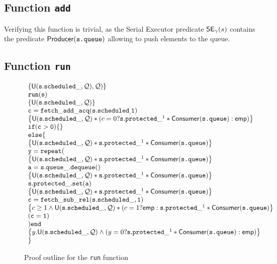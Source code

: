 \subsection{Function \texttt{add}}
Verifying this function is trivial, as the Serial Executor predicate $\mathsf{SE}_\gamma(s)$ contains the predicate $\mathsf{Producer}(\texttt{s.queue})$ allowing to push elements to the queue.

\subsection{Function \texttt{run}}

\begin{figure}
\begin{equation*}
		\begin{array}{l}
				\left\{\mathsf{U}(\mathtt{s.scheduled\_}, \mathcal{Q}), \mathcal{Q})\right\} \\
		\mathtt{run(s)} \\
		\left\{\mathsf{U}(\mathtt{s.scheduled\_}, \mathcal{Q}) \right\} \\
		\mathtt{c = fetch\_add\_acq(s.scheduled_, 1)} \\
		\left\{ \mathsf{U}(\mathtt{s.scheduled\_}, \mathcal{Q}) * (c = 0 ? \mathtt{s.protected\_}^1 * \mathsf{Consumer}(\texttt{s.queue}) : \mathsf{emp}) \right\}\\
		\mathtt{if(c > 0) \{\}}\\
				\mathtt{else \{} \\
		\left\{\mathsf{U}(\mathtt{s.scheduled\_}, \mathcal{Q}) * \mathtt{s.protected\_}^1 * \mathsf{Consumer}(\texttt{s.queue}) \right\} \\
		\mathtt{y = repeat (} \\
		\left\{\mathsf{U}(\mathtt{s.scheduled\_}, \mathcal{Q})* \mathtt{s.protected\_}^1 * \mathsf{Consumer}(\texttt{s.queue}) \right\} \\
		\mathtt{a = s.queue\_.dequeue()} \\
		\left\{\mathsf{U}(\mathtt{s.scheduled\_}, \mathcal{Q})* \mathtt{s.protected\_}^1 * \mathsf{Consumer}(\texttt{s.queue}) \right\} \\
		\mathtt{s.protected\_.set(a)} \\
		\left\{\mathsf{U}(\mathtt{s.scheduled\_}, \mathcal{Q})* \mathtt{s.protected\_}^1 * \mathsf{Consumer}(\texttt{s.queue}) \right\} \\
		\mathtt{c = fetch\_sub\_rel(s.scheduled\_, 1)}\\	
		\left\{c \geq 1 \land \mathsf{U}(\mathtt{s.scheduled\_}, \mathcal{Q}) * (c = 1 ? \mathsf{emp} : \mathtt{s.protected\_}^1 * \mathsf{Consumer}(\texttt{s.queue}) \right\} \\
		\mathtt{(c = 1)}\\
		\mathtt{) end}\\
				\left\{ y. \mathsf{U}(\mathtt{s.scheduled\_}, \mathcal{Q}) \land (y=0?\mathtt{s.protected\_}^1 * \mathsf{Consumer}(\texttt{s.queue}) : \mathsf{emp}) \right\} \\

				\}
		\end{array}
\end{equation*}

		\caption{Proof outline for the \texttt{run} function}
		\label{fig:run}
\end{figure}


